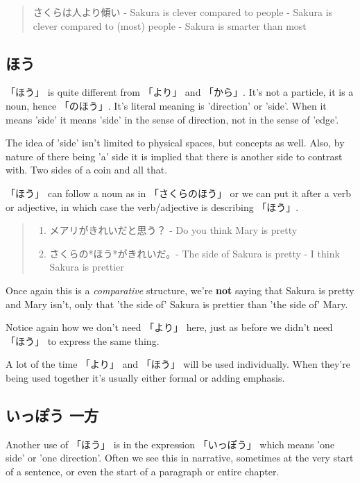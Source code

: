 \documentclass[11pt]{article}
\begin{document}
\begin{quote}
さくらは人より傾い - Sakura is clever compared to people - Sakura is clever compared to (most) people - Sakura is smarter than most
\end{quote}

\subsection{ほう}
\label{sec:org558bfca}
「ほう」 is quite different from 「より」 and 「から」. It's not a particle, it is a noun, hence 「のほう」. It's literal meaning is 'direction' or 'side'. When it means 'side' it means 'side' in the sense of direction, not in the sense of 'edge'.

The idea of 'side' isn't limited to physical spaces, but concepts as well. Also, by nature of there being 'a' side it is implied that there is another side to contrast with. Two sides of a coin and all that.

「ほう」 can follow a noun as in 「さくらのほう」 or we can put it after a verb or adjective, in which case the verb/adjective is describing 「ほう」.
\begin{quote}
\begin{enumerate}
\item メアリがきれいだと思う？ - Do you think Mary is pretty
\item さくらの*ほう*がきれいだ。- The side of Sakura is pretty - I think Sakura is prettier
\end{enumerate}
\end{quote}
Once again this is a \emph{comparative} structure, we're \textbf{not} saying that Sakura is pretty and Mary isn't, only that 'the side of' Sakura is prettier than 'the side of' Mary.

Notice again how we don't need 「より」 here, just as before we didn't need 「ほう」 to express the same thing.

A lot of the time 「より」 and 「ほう」 will be used individually. When they're being used together it's usually either formal or adding emphasis.

\subsection{いっぽう 一方}
\label{sec:orgae8a939}
Another use of 「ほう」 is in the expression 「いっぽう」 which means 'one side' or 'one direction'. Often we see this in narrative, sometimes at the very start of a sentence, or even the start of a paragraph or entire chapter.
\end{document}
